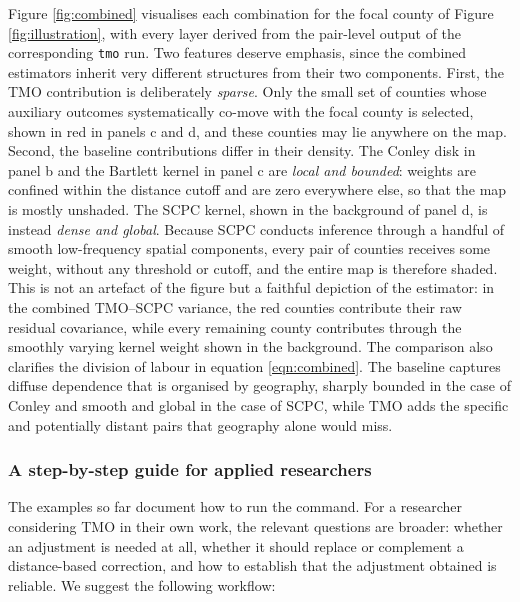 \documentclass[varwidth,bib]{statapress}
\begin{document}
Figure \ref{fig:combined} visualises each combination for the focal county of Figure \ref{fig:illustration}, with every layer derived from the pair-level output of the corresponding {\tt tmo} run.  Two features deserve emphasis, since the combined estimators inherit very different structures from their two components.  First, the TMO contribution is deliberately \textit{sparse}.  Only the small set of counties whose auxiliary outcomes systematically co-move with the focal county is selected, shown in red in panels c and d, and these counties may lie anywhere on the map.  Second, the baseline contributions differ in their density.  The Conley disk in panel b and the Bartlett kernel in panel c are \textit{local and bounded}: weights are confined within the distance cutoff and are zero everywhere else, so that the map is mostly unshaded.  The SCPC kernel, shown in the background of panel d, is instead \textit{dense and global}.  Because SCPC conducts inference through a handful of smooth low-frequency spatial components, every pair of counties receives some weight, without any threshold or cutoff, and the entire map is therefore shaded.  This is not an artefact of the figure but a faithful depiction of the estimator: in the combined TMO--SCPC variance, the red counties contribute their raw residual covariance, while every remaining county contributes through the smoothly varying kernel weight shown in the background.  The comparison also clarifies the division of labour in equation \eqref{eqn:combined}.  The baseline captures diffuse dependence that is organised by geography, sharply bounded in the case of Conley and smooth and global in the case of SCPC, while TMO adds the specific and potentially distant pairs that geography alone would miss.

\subsubsection{A step-by-step guide for applied researchers}
\label{sscn:guide}
The examples so far document how to run the command.  For a researcher considering TMO in their own work, the relevant questions are broader: whether an adjustment is needed at all, whether it should replace or complement a distance-based correction, and how to establish that the adjustment obtained is reliable.  We suggest the following workflow:
\end{document}
